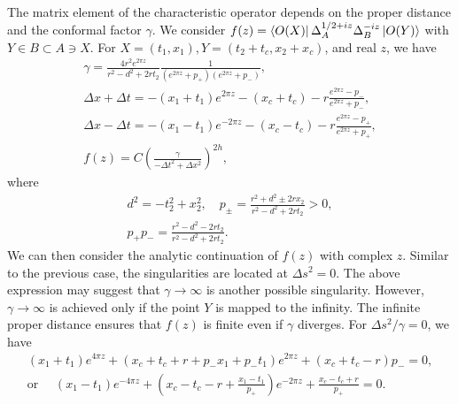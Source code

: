 \documentclass[a4paper,11pt]{article}
\theoremstyle{definition}
\begin{document}
The matrix element of the characteristic operator depends on the proper distance and the conformal factor $\gamma$. We consider $f(z)=\bra{O(X)}\Delta_A^{1/2+iz}\Delta_B^{-iz}\ket{O(Y)}$ with $Y\in B \subset A\ni X$. For $X = (t_1,x_1), Y = (t_2+t_c,x_2+x_c)$, and real $z$, we have
\begin{gather}
    \gamma= \frac{4r^2 e^{2\pi z}}{r^2-d^2+2rt_2} \frac{1}{(e^{2\pi z} + p_+)(e^{2\pi z} + p_-)},\\
    \Delta x + \Delta t = -(x_1+t_1)e^{2\pi z} - (x_c+t_c) - r\frac{e^{2\pi z}-p_-}{e^{2\pi z}+p_-},\\
    \Delta x - \Delta t = - (x_1-t_1)e^{-2\pi z} - (x_c-t_c) - r\frac{e^{2\pi z}-p_+}{e^{2\pi z}+p_+},\\
    f(z) = C \left(\frac{\gamma}{-\Delta t^2 + \Delta x^2} \right)^{2h},
\end{gather}
where
\begin{gather}
    d^2 = -t_2^2 + x_2^2, \quad p_\pm = \frac{r^2+d^2\pm 2rx_2}{r^2-d^2+2rt_2} > 0,\\
    p_+p_- = \frac{r^2-d^2-2rt_2}{r^2-d^2+2rt_2}.
\end{gather}
We can then consider the analytic continuation of $f(z)$ with complex $z$. Similar to the previous case, the singularities are located at $\Delta s^2 = 0$. The above expression may suggest that $\gamma \to \infty$ is another possible singularity. However, $\gamma \to \infty$ is achieved only if the point $Y$ is mapped to the infinity. The infinite proper distance ensures that $f(z)$ is finite even if $\gamma$ diverges. For $\Delta s^2/\gamma = 0$, we have
\begin{gather}
    (x_1+t_1)e^{4\pi z} +  (x_c + t_c + r + p_-x_1+ p_-t_1)e^{2\pi z}+ (x_c+t_c-r) p_-  = 0,\\
    \text{or } \quad (x_1-t_1)e^{-4\pi z}+ \left(x_c - t_c - r+\frac{x_1-t_1}{p_+}\right)e^{-2\pi z} + \frac{x_c-t_c + r}{p_+} = 0.
\end{gather}
\end{document}
